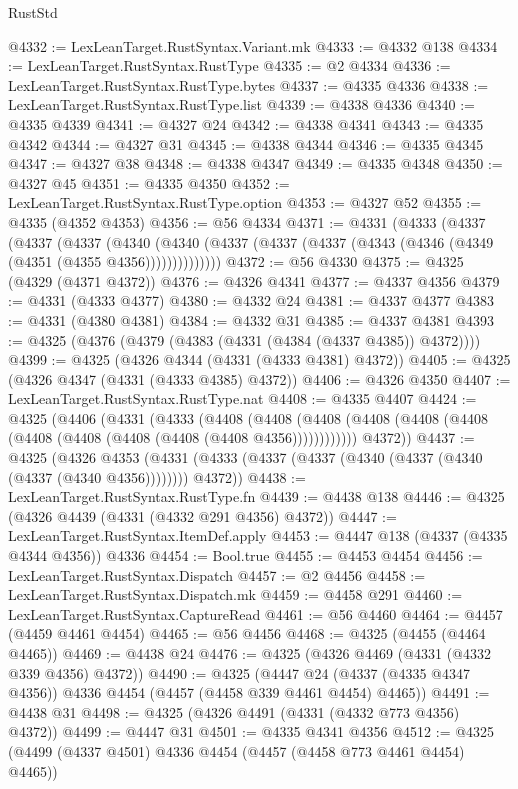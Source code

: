 \begin{lexlean}{RustStd}
\begin{coremodule}
{\begin{coremodule}
{{{{{{{{{{{{{{{{{{{{{{{{{{{{{{{{{{{{{{{{{{{{{{{{{{{{{{{{{{{{{{{{{{{{{{{{{{{{{{{{@4332 := LexLeanTarget.RustSyntax.Variant.mk
@4333 := @4332 @138
@4334 := LexLeanTarget.RustSyntax.RustType
@4335 := @2 @4334
@4336 := LexLeanTarget.RustSyntax.RustType.bytes
@4337 := @4335 @4336
@4338 := LexLeanTarget.RustSyntax.RustType.list
@4339 := @4338 @4336
@4340 := @4335 @4339
@4341 := @4327 @24
@4342 := @4338 @4341
@4343 := @4335 @4342
@4344 := @4327 @31
@4345 := @4338 @4344
@4346 := @4335 @4345
@4347 := @4327 @38
@4348 := @4338 @4347
@4349 := @4335 @4348
@4350 := @4327 @45
@4351 := @4335 @4350
@4352 := LexLeanTarget.RustSyntax.RustType.option
@4353 := @4327 @52
@4355 := @4335 (@4352 @4353)
@4356 := @56 @4334
@4371 := @4331
    (@4333
      (@4337
        (@4337
          (@4337
            (@4340
              (@4340 (@4337 (@4337 (@4337 (@4343 (@4346 (@4349 (@4351 (@4355 @4356))))))))))))))
@4372 := @56 @4330
@4375 := @4325 (@4329 (@4371 @4372))
@4376 := @4326 @4341
@4377 := @4337 @4356
@4379 := @4331 (@4333 @4377)
@4380 := @4332 @24
@4381 := @4337 @4377
@4383 := @4331 (@4380 @4381)
@4384 := @4332 @31
@4385 := @4337 @4381
@4393 := @4325 (@4376 (@4379 (@4383 (@4331 (@4384 (@4337 @4385)) @4372))))
@4399 := @4325 (@4326 @4344 (@4331 (@4333 @4381) @4372))
@4405 := @4325 (@4326 @4347 (@4331 (@4333 @4385) @4372))
@4406 := @4326 @4350
@4407 := LexLeanTarget.RustSyntax.RustType.nat
@4408 := @4335 @4407
@4424 := @4325
    (@4406
      (@4331
        (@4333
          (@4408
            (@4408 (@4408 (@4408 (@4408 (@4408 (@4408 (@4408 (@4408 (@4408 (@4408 @4356))))))))))))
        @4372))
@4437 := @4325
    (@4326
      @4353
      (@4331 (@4333 (@4337 (@4337 (@4340 (@4337 (@4340 (@4337 (@4340 @4356)))))))) @4372))
@4438 := LexLeanTarget.RustSyntax.RustType.fn
@4439 := @4438 @138
@4446 := @4325 (@4326 @4439 (@4331 (@4332 @291 @4356) @4372))
@4447 := LexLeanTarget.RustSyntax.ItemDef.apply
@4453 := @4447 @138 (@4337 (@4335 @4344 @4356)) @4336
@4454 := Bool.true
@4455 := @4453 @4454
@4456 := LexLeanTarget.RustSyntax.Dispatch
@4457 := @2 @4456
@4458 := LexLeanTarget.RustSyntax.Dispatch.mk
@4459 := @4458 @291
@4460 := LexLeanTarget.RustSyntax.CaptureRead
@4461 := @56 @4460
@4464 := @4457 (@4459 @4461 @4454)
@4465 := @56 @4456
@4468 := @4325 (@4455 (@4464 @4465))
@4469 := @4438 @24
@4476 := @4325 (@4326 @4469 (@4331 (@4332 @339 @4356) @4372))
@4490 := @4325
    (@4447 @24 (@4337 (@4335 @4347 @4356)) @4336 @4454 (@4457 (@4458 @339 @4461 @4454) @4465))
@4491 := @4438 @31
@4498 := @4325 (@4326 @4491 (@4331 (@4332 @773 @4356) @4372))
@4499 := @4447 @31
@4501 := @4335 @4341 @4356
@4512 := @4325 (@4499 (@4337 @4501) @4336 @4454 (@4457 (@4458 @773 @4461 @4454) @4465))
}}}}}}}}}}}}}}}}}}}}}}}}}}}}}}}}}}}}}}}}}}}}}}}}}}}}}}}}}}}}}}}}}}}}}}}}}}}}}}}}
\end{coremodule}}
\end{coremodule}
\end{lexlean}

